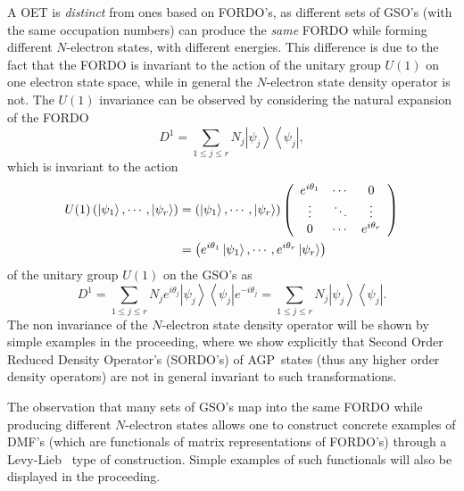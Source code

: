 \documentclass[aps,preprint]{revtex4}%
\begin{document}
A OET is \emph{distinct} from ones based on FORDO's, as different sets of
GSO's (with the same occupation numbers) can produce the \emph{same} FORDO
while forming different $N$-electron states, with different energies. This
difference is due to the fact that the FORDO is invariant to the action of the
unitary group $U(1)$ on one electron state space, while in general the
$N$-electron state density operator is not. The $U(1)$ invariance can be
observed by considering the natural expansion of the FORDO
\begin{equation}
D^{1}=\sum_{1\leq j\leq r}N_{j}\left\vert \psi_{j}\right\rangle \left\langle
\psi_{j}\right\vert ,
\end{equation}
which is invariant to the action
\begin{align}
U(1)\left(  \left\vert \psi_{1}\right\rangle ,\cdots,\left\vert \psi
_{r}\right\rangle \right)   &  =\left(  \left\vert \psi_{1}\right\rangle
,\cdots,\left\vert \psi_{r}\right\rangle \right)  \left(
\begin{array}
[c]{ccc}%
e^{i\theta_{1}} & \cdots & 0\\
\vdots & \ddots & \vdots\\
0 & \cdots & e^{i\theta_{r}}%
\end{array}
\right) \nonumber\\
&  =\left(  e^{i\theta_{1}}\left\vert \psi_{1}\right\rangle ,\cdots
,e^{i\theta_{r}}\left\vert \psi_{r}\right\rangle \right)
\end{align}
of the unitary group $U(1)$ on the GSO's as%
\begin{equation}
D^{1}=\sum_{1\leq j\leq r}N_{j}e^{i\theta_{j}}\left\vert \psi_{j}\right\rangle
\left\langle \psi_{j}\right\vert e^{-i\theta_{j}}=\sum_{1\leq j\leq r}%
N_{j}\left\vert \psi_{j}\right\rangle \left\langle \psi_{j}\right\vert .
\end{equation}
The non invariance of the $N$-electron state density operator will be shown by
simple examples in the proceeding, where we show explicitly that Second Order
Reduced Density Operator's (SORDO's) of AGP\ states (thus any higher order
density operators) are not in general invariant to such transformations.

The observation that many sets of GSO's map into the same FORDO while
producing different $N$-electron states allows one to construct concrete
examples of DMF's (which are functionals of matrix representations of FORDO's)
through a Levy-Lieb \cite{Levy1979, Lieb1983}\ type of construction. Simple
examples of such functionals will also be displayed in the proceeding.
\end{document}
